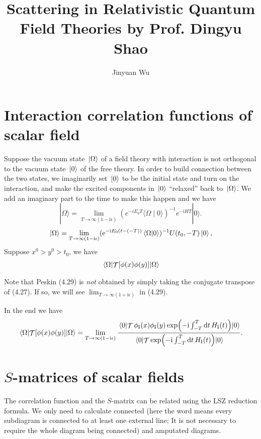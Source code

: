 \documentclass[hyperref, a4paper]{article}
\title{Scattering in Relativistic Quantum Field Theories by Prof. Dingyu Shao}
\author{Jinyuan Wu}
\DeclareMathOperator{\timeorder}{\mathcal{T}}
\newcommand*{\ii}{\mathrm{i}}
\newcommand*{\ee}{\mathrm{e}}
\begin{document}
\maketitle

\section{Interaction correlation functions of scalar field}

Suppose the vacuum state $\ket*{\Omega}$ of a field theory with interaction is not orthogonal to the vacuum state $\ket*{0}$ of the free theory.
In order to build connection between the two states, we imaginarily set $\ket*{0}$ to be the initial state and turn on the interaction, 
and make the excited components in $\ket*{0}$ ``relaxed'' back to $\ket*{\Omega}$.
We add an imaginary part to the time to make this happen and we have 
\[
    |\Omega\rangle=\lim _{T \rightarrow \infty(1-\ii \epsilon)}\left(e^{-i E_{0} T}\langle\Omega \mid 0\rangle\right)^{-1} e^{-\ii H T}|0\rangle.
\]
\begin{equation}
    \ket*{\Omega} = \lim_{T \to \infty(1 - \ii \epsilon)} (\ee^{- \ii E_0 (t - (-T))} \braket*{\Omega}{0})^{-1} U(t_0, -T) \ket*{0},
\end{equation}
Suppose $x^0 > y^0 > t_0$, we have 
\[
    \begin{aligned}
        \expval*{\timeorder[\phi(x) \phi(y)]}{\Omega} 
    \end{aligned}
\]

Note that Peskin (4.29) is \emph{not} obtained by simply taking the conjugate transpose of (4.27).
If so, we will see $\lim_{T \to \infty (1 + \ii \epsilon)}$ in (4.29).

In the end we have
\begin{equation}
    \expval*{\timeorder[\phi(x) \phi(y)]}{\Omega} = \lim_{T \to \infty(1 - \ii \epsilon)} \frac{\expval*{\timeorder \phi_\text{I}(x) \phi_\text{I}(y) \exp (- \ii \int_{-T}^T \dd{t} H_\text{I}(t))}{0}}{\expval*{\timeorder \exp(- \ii \int_{-T}^T \dd{t} H_\text{I}(t))}{0}}.
\end{equation}

\section{$S$-matrices of scalar fields}

The correlation function and the $S$-matrix can be related using the LSZ reduction formula. 
We only need to calculate connected (here the word means every subdiagram is connected to at least one 
external line; It is not necessary to require the whole diagram being connected) and amputated diagrams.
\end{document}
